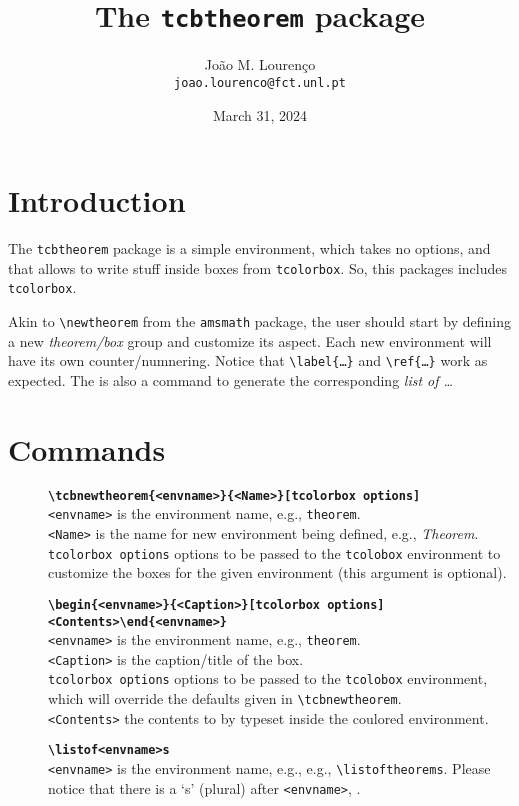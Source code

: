 \documentclass{article}
\newcommand\tcthrm{\texttt{tcbtheorem}\xspace}
\begin{document}
  \title{The \tcthrm package}
  \author{João M. Lourenço\\\texttt{\small joao.lourenco@fct.unl.pt}}
  \date{March 31, 2024}
  
  \maketitle
  

\section{Introduction}
\label{sec:introduction}

The \tcthrm package is a simple environment, which takes no options, and that allows to write stuff inside boxes from \texttt{tcolorbox}.  So, this packages includes \texttt{tcolorbox}.

Akin to \verb!\newtheorem! from the \verb!amsmath! package, the user should start by defining a new \emph{theorem/box} group and customize its aspect. Each new environment will have its own counter/numnering. Notice that \verb!\label{…}! and \verb!\ref{…}! work as expected.  The is also a command to generate the corresponding \emph{list of …}

\section{Commands}
\label{sec:commands}

\begin{description}
  \item[]{\bfseries\verb+\tcbnewtheorem{<envname>}{<Name>}[tcolorbox options]+}\\
      \verb!<envname>! is the environment name, e.g., \verb!theorem!.\\
      \verb!<Name>! is the name for new environment being defined, e.g., \emph{Theorem}.\\
      \verb!tcolorbox options! options to be passed to the \verb!tcolobox! environment to customize the boxes for the given environment (this argument is optional).
  \item[]{\bfseries\verb+\begin{<envname>}{<Caption>}[tcolorbox options]<Contents>\end{<envname>}+}\\
      \verb!<envname>! is the environment name, e.g., \verb!theorem!.\\
      \verb!<Caption>! is the caption/title of the box.\\
      \verb!tcolorbox options! options to be passed to the \verb!tcolobox! environment, which will override the defaults given in \verb!\tcbnewtheorem!.\\
      \verb!<Contents>! the contents to by typeset inside the coulored environment.\\
  \item[]{\bfseries\verb+\listof<envname>s+}\\
      \verb!<envname>! is the environment name, e.g., e.g., \verb!\listoftheorems!.  Please notice that there is a `s' (plural) after \verb!<envname>!, .
\end{description}
\end{document}
